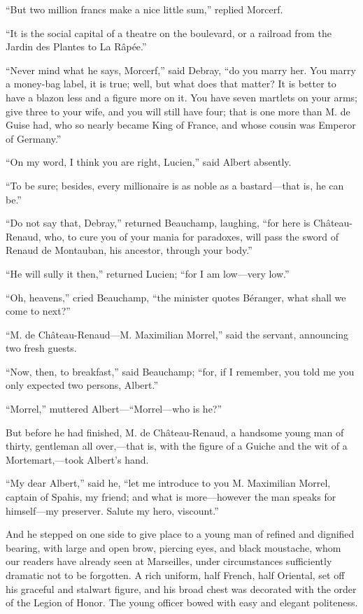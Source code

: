 “But two million francs make a nice little sum,” replied Morcerf.

“It is the social capital of a theatre on the boulevard, or a railroad
from the Jardin des Plantes to La Râpée.”

“Never mind what he says, Morcerf,” said Debray, “do you marry her. You
marry a money-bag label, it is true; well, but what does that matter?
It is better to have a blazon less and a figure more on it. You have
seven martlets on your arms; give three to your wife, and you will
still have four; that is one more than M. de Guise had, who so nearly
became King of France, and whose cousin was Emperor of Germany.”

“On my word, I think you are right, Lucien,” said Albert absently.

“To be sure; besides, every millionaire is as noble as a bastard—that
is, he can be.”

“Do not say that, Debray,” returned Beauchamp, laughing, “for here is
Château-Renaud, who, to cure you of your mania for paradoxes, will pass
the sword of Renaud de Montauban, his ancestor, through your body.”

“He will sully it then,” returned Lucien; “for I am low—very low.”

“Oh, heavens,” cried Beauchamp, “the minister quotes Béranger, what
shall we come to next?”

“M. de Château-Renaud—M. Maximilian Morrel,” said the servant,
announcing two fresh guests.

“Now, then, to breakfast,” said Beauchamp; “for, if I remember, you
told me you only expected two persons, Albert.”

“Morrel,” muttered Albert—“Morrel—who is he?”

But before he had finished, M. de Château-Renaud, a handsome young man
of thirty, gentleman all over,—that is, with the figure of a Guiche and
the wit of a Mortemart,—took Albert’s hand.

“My dear Albert,” said he, “let me introduce to you M. Maximilian
Morrel, captain of Spahis, my friend; and what is more—however the man
speaks for himself—my preserver. Salute my hero, viscount.”

And he stepped on one side to give place to a young man of refined and
dignified bearing, with large and open brow, piercing eyes, and black
moustache, whom our readers have already seen at Marseilles, under
circumstances sufficiently dramatic not to be forgotten. A rich
uniform, half French, half Oriental, set off his graceful and stalwart
figure, and his broad chest was decorated with the order of the Legion
of Honor. The young officer bowed with easy and elegant politeness.

